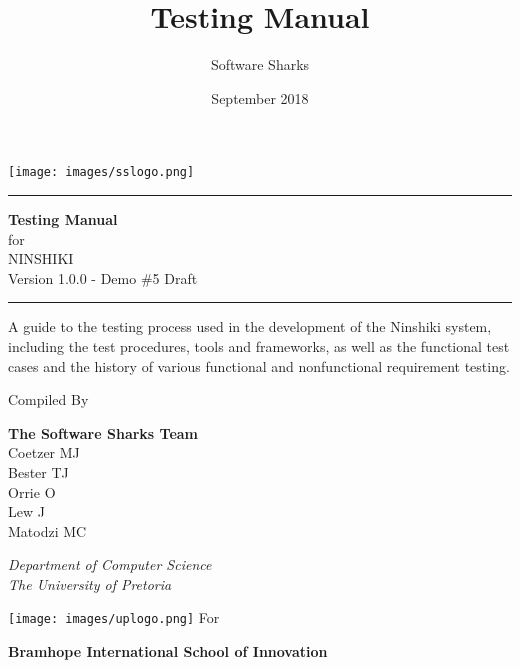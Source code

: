 \documentclass[a4paper, 11pt]{article}
\title{Testing Manual}
\author{Software Sharks}
\date{September 2018}
\newcommand{\systemTitle}{NINSHIKI}
\begin{document}
\begin{titlepage}
\texttt{[image: images/sslogo.png]}
	\centering
	
    \scshape
    \sffamily
	
	\vspace*{\baselineskip}
	
	\rule{\textwidth}{3pt}
	
	\vspace{0.75\baselineskip}
	
	\textrm{\LARGE \textbf{Testing Manual} \\ for\\ \systemTitle{}\\ \small Version 1.0.0 - Demo \#5 Draft\\}
	
	\vspace{0.75\baselineskip}
	
	\rule{\textwidth}{3pt} 
	
	\vspace{2\baselineskip}
	
	A guide to the testing process used in the development of the Ninshiki system, including the test procedures, tools and frameworks, as well as the functional test cases and the history of various functional and nonfunctional requirement testing.\\
	
	\vspace*{3\baselineskip}
	
	Compiled By
	
	\vspace{0.5\baselineskip}
	
    \textsf{\large
    \textrm{\textbf{The Software Sharks Team}} \\
    \small 
    Coetzer MJ \\
    Bester TJ \\
    Orrie O \\
    Lew J \\
    Matodzi MC \\
    } 
	
	\vspace{0.5\baselineskip}
	
	\textit{ Department of Computer Science \\ The University of Pretoria}
	
    \vfill
    \texttt{[image: images/uplogo.png]}
    \vfill
    For
	
	\vspace{0.5\baselineskip}
	
    \textsf{\large
    \textrm{\textbf{Bramhope International School of Innovation}} \\
    } 

\end{titlepage}
\end{document}
